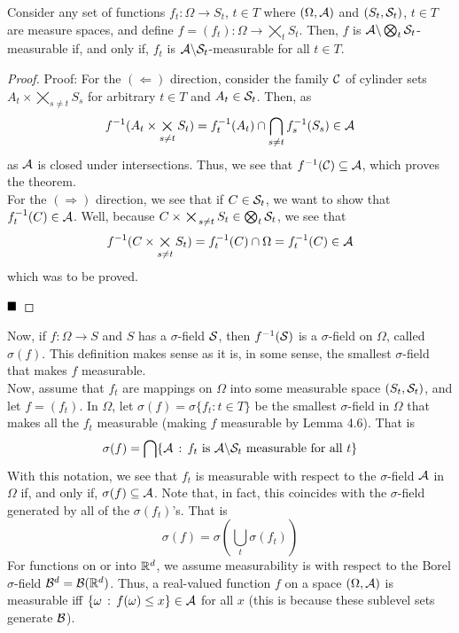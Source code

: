 \begin{lemma}
    Consider any set of functions $f_{t} : \Omega \to S_{t}$, $t \in T$ where $(\Omega, \cal{A})$ and $(S_{t}, \cal{S}_{t})$, $t \in T$ are measure spaces, and define $f = (f_{t}) : \Omega \to \bigtimes_{t} S_{t}$. Then, $f$ is $\cal{A} \backslash \bigotimes_{t} \cal{S}_{t}$-measurable if, and only if, $f_{t}$ is $\cal{A} \backslash \cal{S}_{t}$-measurable for all $t \in T$. 
\end{lemma}
\begin{proof}{Proof:}
    For the $(\Leftarrow)$ direction, consider the family $\cal{C}$ of cylinder sets $A_{t} \times \bigtimes_{s \ne t} S_{s}$ for arbitrary $t \in T$ and $A_{t} \in \cal{S}_{t}$. Then, as
    \[ f^{-1}(A_{t} \times \bigtimes_{s \ne t} S_{t}) = f_{t}^{-1}(A_{t}) \cap \bigcap_{s \ne t} f_{s}^{-1}(S_{s}) \in \cal{A} \]
    as $\cal{A}$ is closed under intersections. Thus, we see that $f^{-1}(\cal{C}) \subseteq \cal{A}$, which proves the theorem.\\

    For the $(\Rightarrow)$ direction, we see that if $C \in \cal{S}_{t}$, we want to show that $f_{t}^{-1}(C) \in \cal{A}$. Well, because $C \times \bigtimes_{s \ne t} S_{t} \in \bigotimes_{t} \cal{S}_{t}$, we see that
    \[ f^{-1}(C \times \bigtimes_{s \ne t} S_{t}) = f_{t}^{-1}(C) \cap \Omega = f_{t}^{-1}(C) \in \cal{A} \]
    which was to be proved. 

    $\qed$
\end{proof}

Now, if $f : \Omega \to S$ and $S$ has a $\sigma$-field $\cal{S}$, then $f^{-1}(\cal{S})$ is a $\sigma$-field on $\Omega$, called $\sigma(f)$. This definition makes sense as it is, in some sense, the smallest $\sigma$-field that makes $f$ measurable.\\

Now, assume that $f_{t}$ are mappings on $\Omega$ into some measurable space $(S_{t}, \cal{S}_{t})$, and let $f = (f_{t})$. In $\Omega$, let $\sigma(f) = \sigma\{f_{t} : t \in T\}$ be the smallest $\sigma$-field in $\Omega$ that makes all the $f_{t}$ measurable (making $f$ measurable by Lemma 4.6). That is
\[ \sigma(f) = \bigcap \{\cal{A} \col f_{t} \text{ is } \cal{A} \backslash \cal{S}_{t} \text{ measurable for all } t\} \]
With this notation, we see that $f_{t}$ is measurable with respect to the $\sigma$-field $\cal{A}$ in $\Omega$ if, and only if, $\sigma(f) \subseteq \cal{A}$. Note that, in fact, this coincides with the $\sigma$-field generated by all of the $\sigma(f_{t})$'s. That is
\[ \sigma(f) = \sigma\left(\bigcup_{t} \sigma(f_{t})\right) \]
For functions on or into $\R^d$, we assume measurability is with respect to the Borel $\sigma$-field $\cal{B}^{d} = \cal{B}(\R^{d})$. Thus, a real-valued function $f$ on a space $(\Omega, \cal{A})$ is measurable iff $\{\omega \col f(\omega) \leq x\} \in \cal{A}$ for all $x$ (this is because these sublevel sets generate $\cal{B}$).\\

